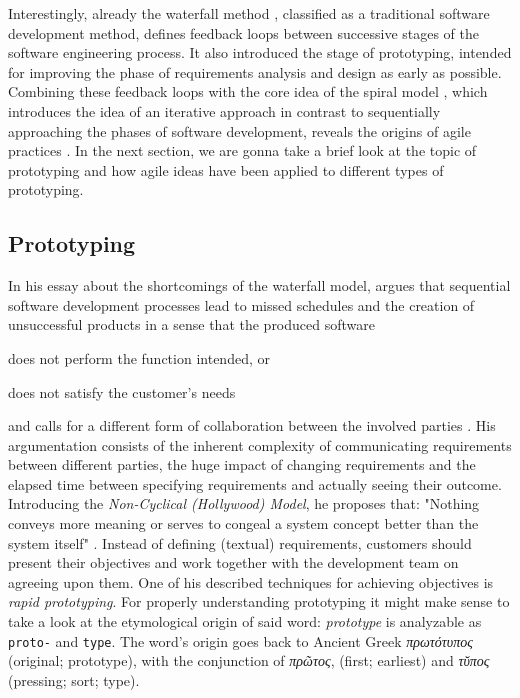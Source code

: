 
Interestingly, already the waterfall method \cite{royce_managing_1987}, classified as a traditional software development method, defines feedback loops between successive stages of the software engineering process.
It also introduced the stage of prototyping, intended for improving the phase of requirements analysis and design as early as possible.
Combining these feedback loops with the core idea of the spiral model \cite{boehm_spiral_1988}, which introduces the idea of an iterative approach in contrast to sequentially approaching the phases of software development, reveals the origins of agile practices \cite{misra_agile_2012}.
In the next section, we are gonna take a brief look at the topic of prototyping and how agile ideas have been applied to different types of prototyping.


\subsection{Prototyping}
In his essay  about the shortcomings of the waterfall model, \citeauthor{gladden_stop_1982} argues that sequential software development processes lead to missed schedules and the creation of unsuccessful products in a sense that the produced software \begin{enumerate*}[label=(\roman*)]
\item does not perform the function intended, or
\item does not satisfy the customer's needs
\end{enumerate*}
and calls for a different form of collaboration between the involved parties \cite{gladden_stop_1982}.
His argumentation consists of the inherent complexity of communicating requirements between different parties, the huge impact of changing requirements and the elapsed time between specifying requirements and actually seeing their outcome.
Introducing the \emph{Non-Cyclical (Hollywood) Model}, he proposes that: "Nothing conveys more meaning or serves to congeal a system concept better than the system itself" \cite{gladden_stop_1982}.
Instead of defining (textual) requirements, customers should present their objectives and work together with the development team on agreeing upon them.
One of his described techniques for achieving objectives is \emph{rapid prototyping}.
For properly understanding prototyping it might make sense to take a look at the etymological origin of said word: \emph{prototype} is analyzable as \texttt{proto-} and \texttt{type}.
The word's origin goes back to Ancient Greek \emph{\textgreek{πρωτότυπος}} (original; prototype), with the conjunction of \emph{\textgreek{πρῶτος}}, (first; earliest) and \emph{\textgreek{τῠπος}} (pressing; sort; type). %

